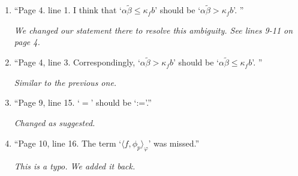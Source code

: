 \documentclass[12pt,a4paper]{amsart}
\begin{document}
	\begin{enumerate}
		\item ``Page 4. line 1. I think that `$\alpha \widetilde \beta \leq \kappa_f b$' should be `$\alpha \tilde \beta > \kappa_f b$'. ''
		
		\emph{We changed our statement there to resolve this ambiguity. See lines 9-11 on page 4.}
		
		\item ``Page 4, line 3. Correspondingly, `$\alpha \tilde \beta > \kappa_f b$' should be `$\alpha \tilde \beta \leq \kappa_f b$'. ''
		
		\emph{Similar to the previous one.}
		
		\item ``Page 9, line 15. `$=$' should be `:='.''
		
		\emph{Changed as suggested.}
		
		\item ``Page 10, line 16. The term `$\langle f, \phi_p\rangle_{\varphi}$' was missed.''
		
		\emph{This is a typo. We added it back.}
	
	\end{enumerate}
\end{document}
